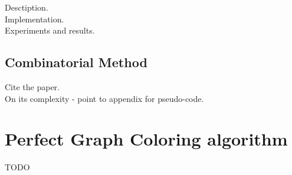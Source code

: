 \documentclass{article}
\begin{document}
Desctiption.\\

Implementation.\\

Experiments and results.\\

\subsection{Combinatorial Method}

Cite the paper.\\

On its complexity - point to appendix for pseudo-code.

\appendix
\appendixpage
\addappheadtotoc

\section{Perfect Graph Coloring algorithm}
TODO


% 
\printbibliography
\end{document}
